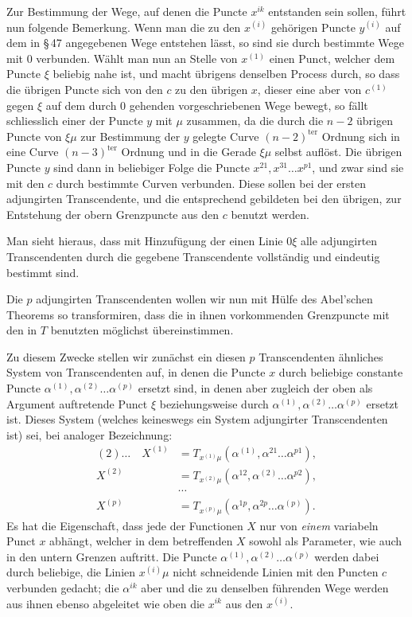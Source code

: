 \documentclass[10pt]{article}
\begin{document}
Zur Bestimmung der Wege, auf denen die Puncte \(x^{ik}\) entstanden sein sollen, führt nun folgende Bemerkung. Wenn man die zu den \(x^{(i)}\) gehörigen Puncte \(y^{(i)}\) auf dem in \S\,47 angegebenen Wege entstehen lässt, so sind sie durch bestimmte Wege mit \(0\) verbunden. Wählt man nun an Stelle von \(x^{(1)}\) einen Punct, welcher dem Puncte \(\xi\) beliebig nahe ist, und macht übrigens denselben Process durch, so dass die übrigen Puncte sich von den \(c\) zu den übrigen \(x\), dieser eine aber von \(c^{(1)}\) gegen \(\xi\) auf dem durch \(0\) gehenden vorgeschriebenen Wege bewegt, so fällt schliesslich einer der Puncte \(y\) mit \(\mu\) zusammen, da die durch die \(n-2\) übrigen Puncte von \(\xi\mu\) zur Bestimmung der \(y\) gelegte Curve \((n-2)^{\mathrm{ter}}\) Ordnung sich in eine Curve \((n-3)^{\mathrm{ter}}\) Ordnung und in die Gerade \(\xi\mu\) selbst auflöst. Die übrigen Puncte \(y\) sind dann in beliebiger Folge die Puncte \(x^{21},x^{31}\ldots x^{p1}\), und zwar sind sie mit den \(c\) durch bestimmte Curven verbunden. Diese sollen bei der ersten adjungirten Transcendente, und die entsprechend gebildeten bei den übrigen, zur Entstehung der obern Grenzpuncte aus den \(c\) benutzt werden.

Man sieht hieraus, dass mit Hinzufügung der einen Linie \(0\xi\) alle adjungirten Transcendenten durch die gegebene Transcendente vollständig und eindeutig bestimmt sind.

Die \(p\) adjungirten Transcendenten wollen wir nun mit Hülfe des Abel'schen Theorems so transformiren, dass die in ihnen vorkommenden Grenzpuncte mit den in \(T\) benutzten möglichst übereinstimmen.

Zu diesem Zwecke stellen wir zunächst ein diesen \(p\) Transcendenten ähnliches System von Transcendenten auf, in denen die Puncte \(x\) durch beliebige constante Puncte \(\alpha^{(1)},\alpha^{(2)}\ldots\alpha^{(p)}\) ersetzt sind, in denen aber zugleich der oben als Argument auftretende Punct \(\xi\) beziehungsweise durch \(\alpha^{(1)},\alpha^{(2)}\ldots\alpha^{(p)}\) ersetzt ist. Dieses System (welches keineswegs ein System adjungirter Transcendenten ist) sei, bei analoger Bezeichnung:
\[
\begin{aligned}
(2)\ldots\quad X^{(1)}&=T_{x^{(1)}\mu}(\alpha^{(1)},\alpha^{21}\ldots\alpha^{p1}),\\
X^{(2)}&=T_{x^{(2)}\mu}(\alpha^{12},\alpha^{(2)}\ldots\alpha^{p2}),\\[-0.35em]
&\cdots\\[-0.35em]
X^{(p)}&=T_{x^{(p)}\mu}(\alpha^{1p},\alpha^{2p}\ldots\alpha^{(p)}).
\end{aligned}
\]
Es hat die Eigenschaft, dass jede der Functionen \(X\) nur von \emph{einem} variabeln Punct \(x\) abhängt, welcher in dem betreffenden \(X\) sowohl als Parameter, wie auch in den untern Grenzen auftritt. Die Puncte \(\alpha^{(1)},\alpha^{(2)}\ldots\alpha^{(p)}\) werden dabei durch beliebige, die Linien \(x^{(i)}\mu\) nicht schneidende Linien mit den Puncten \(c\) verbunden gedacht; die \(\alpha^{ik}\) aber und die zu denselben führenden Wege werden aus ihnen ebenso abgeleitet wie oben die \(x^{ik}\) aus den \(x^{(i)}\).
\end{document}

